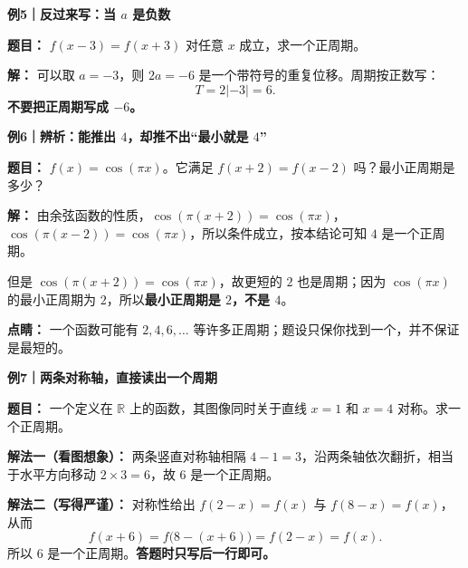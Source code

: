 \clearpage
\begin{examplebox}
\textbf{\textcolor{CExample}{例5｜反过来写：当 $a$ 是负数}}



\textbf{题目：} $f(x-3)=f(x+3)$ 对任意 $x$ 成立，求一个正周期。

\textbf{解：} 可以取 $a=-3$，则 $2a=-6$ 是一个带符号的重复位移。周期按正数写：
\[
T=2|-3|=\boxed{6}.
\]
\textbf{不要把正周期写成 $-6$。}

\medskip

\end{examplebox}
\clearpage
\begin{examplebox}
\textbf{\textcolor{CExample}{例6｜辨析：能推出 $4$，却推不出“最小就是 $4$”}}



\textbf{题目：} $f(x)=\cos(\pi x)$。它满足 $f(x+2)=f(x-2)$ 吗？最小正周期是多少？

\textbf{解：} 由余弦函数的性质，$\cos(\pi(x+2))=\cos(\pi x)$，$\cos(\pi(x-2))=\cos(\pi x)$，所以条件成立，按本结论可知 $4$ 是一个正周期。

但是 $\cos(\pi(x+2))=\cos(\pi x)$，故更短的 $2$ 也是周期；因为 $\cos(\pi x)$ 的最小正周期为 $2$，所以\textbf{最小正周期是 $2$，不是 $4$}。

\textbf{点睛：} 一个函数可能有 $2,4,6,\ldots$ 等许多正周期；题设只保你找到一个，并不保证是最短的。

\medskip

\end{examplebox}
\clearpage
\begin{examplebox}
\textbf{\textcolor{CExample}{例7｜两条对称轴，直接读出一个周期}}



\textbf{题目：} 一个定义在 $\mathbb R$ 上的函数，其图像同时关于直线 $x=1$ 和 $x=4$ 对称。求一个正周期。

\textbf{解法一（看图想象）：} 两条竖直对称轴相隔 $4-1=3$，沿两条轴依次翻折，相当于水平方向移动 $2\times3=6$，故 $6$ 是一个正周期。

\textbf{解法二（写得严谨）：} 对称性给出 $f(2-x)=f(x)$ 与 $f(8-x)=f(x)$，从而
\[
f(x+6)=f\big(8-(x+6)\big)=f(2-x)=f(x).
\]
所以 $\boxed{6\text{ 是一个正周期}}$。\textbf{答题时只写后一行即可。}
\end{examplebox}
